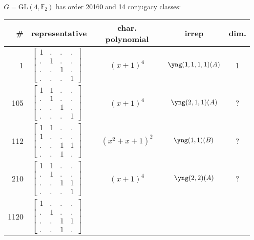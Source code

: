 \documentclass[11pt,oneside]{article}
\newcommand{\GL}{\mathrm{GL}}
\newcommand{\Field}{\mathbb{F}}
\newcommand{\tensor}{\otimes}
\begin{document}

$G=\GL(4,\Field_2)$ has order 20160 and 14 conjugacy classes:
\begin{center}
\begin{tabular}{r|l|c|c|c}
\# & representative & char. polynomial & irrep & dim. \\
\hline
1  & $\begin{bmatrix}1&.&.&.\\.&1&.&.\\.&.&1&.\\.&.&.&1\end{bmatrix}$  & $(x+1)^4$  & $\yng(1,1,1,1)(A)$ & 1  \\
105  & $\begin{bmatrix}1&1&.&.\\.&1&.&.\\.&.&1&.\\.&.&.&1\end{bmatrix}$  & $(x+1)^4$  & $\yng(2,1,1)(A)$ & ?  \\
112  & $\begin{bmatrix}1&1&.&.\\1&.&.&.\\.&.&1&1\\.&.&1&.\end{bmatrix}$  & $(x^2+x+1)^2$  & $\yng(1,1)(B)$ & ?  \\
210  & $\begin{bmatrix}1&1&.&.\\.&1&.&.\\.&.&1&1\\.&.&.&1\end{bmatrix}$  & $(x+1)^4$  & $\yng(2,2)(A)$ & ?  \\
1120  & $\begin{bmatrix}1&.&.&.\\.&1&.&.\\.&.&1&1\\.&.&1&.\end{bmatrix}$

\end{tabular}
\end{center}
\end{document}

